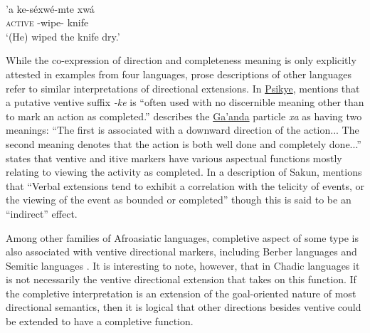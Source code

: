 \ea\label{ex:psik20b}
 \\
\gll 'a ke-séxwé-mte xwá	\\
\textsc{active} -wipe- knife	\\
\glt `(He) wiped the knife dry.'
\z 

While the co-expression of direction and completeness meaning is only explicitly attested in examples from four languages, prose descriptions of other languages refer to similar interpretations of directional extensions. In \hyperref[psik]{Psikye}, \citet[165]{smithKapsikiLanguage1969} mentions that a putative ventive suffix \textit{-ke} is ``often used with no discernible meaning other than to mark an action as completed.'' \citet[186]{newmanCaseGrammarGa1971} describes the \hyperref[gaan]{Ga'anda} particle \textit{xa} as having two meanings: ``The first is associated with a downward direction of the action... The second meaning denotes that the action is both well done and completely done...'' \citet[216--220]{melisDescriptionMasaTchad1999} states that ventive and itive markers have various aspectual functions mostly relating to viewing the activity as completed. In a description of Sakun, \citet[121]{thomasGrammarSakunSukur2014} mentions that ``Verbal extensions tend to exhibit a correlation with the telicity of events, or the viewing of the event as bounded or completed'' though this is said to be an ``indirect'' effect. 

Among other families of Afroasiatic languages, completive aspect of some type is also associated with ventive directional markers, including Berber languages \citep{mettouchiGrammaticalizationDirectionalClitics2011} and Semitic languages \citep{sjorsMotionVoiceMood2023}. It is interesting to note, however, that in Chadic languages it is not necessarily the ventive directional extension that takes on this function. If the completive interpretation is an extension of the goal-oriented nature of most directional semantics, then it is logical that other directions besides ventive could be extended to have a completive function.

